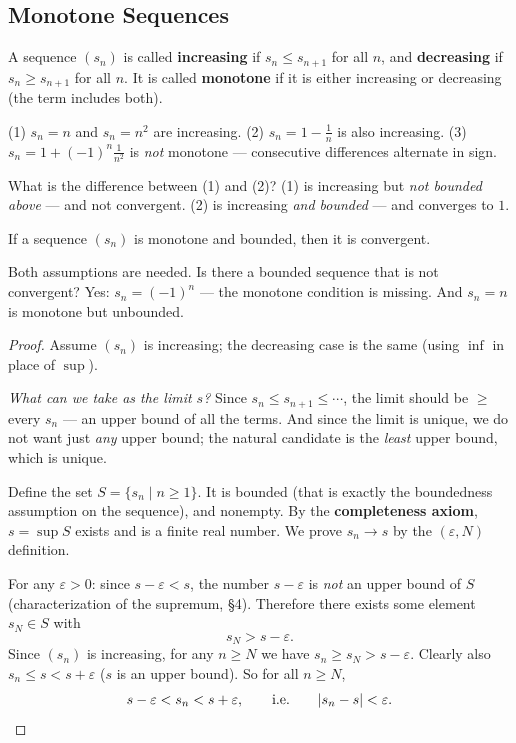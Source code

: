\documentclass[11pt]{report}
\begin{document}
\subsection{Monotone Sequences}

\begin{defbox}
A sequence $(s_n)$ is called \textbf{increasing} if $s_n \leq s_{n+1}$ for all $n$, and \textbf{decreasing} if $s_n \geq s_{n+1}$ for all $n$. It is called \textbf{monotone} if it is either increasing or decreasing (the term includes both).
\end{defbox}

\begin{exbox}
(1) $s_n = n$ and $s_n = n^2$ are increasing. (2) $s_n = 1 - \tfrac1n$ is also increasing. (3) $s_n = 1 + (-1)^n \tfrac{1}{n^2}$ is \emph{not} monotone --- consecutive differences alternate in sign.

What is the difference between (1) and (2)? (1) is increasing but \emph{not bounded above} --- and not convergent. (2) is increasing \emph{and bounded} --- and converges to $1$.
\end{exbox}

\begin{thmbox}
If a sequence $(s_n)$ is monotone and bounded, then it is convergent.
\end{thmbox}

\begin{rembox}
Both assumptions are needed. Is there a bounded sequence that is not convergent? Yes: $s_n = (-1)^n$ --- the monotone condition is missing. And $s_n = n$ is monotone but unbounded.
\end{rembox}

\begin{proof}
Assume $(s_n)$ is increasing; the decreasing case is the same (using $\inf$ in place of $\sup$).

\emph{What can we take as the limit $s$?} Since $s_n \leq s_{n+1} \leq \cdots$, the limit should be $\geq$ every $s_n$ --- an upper bound of all the terms. And since the limit is unique, we do not want just \emph{any} upper bound; the natural candidate is the \emph{least} upper bound, which is unique.

Define the set $S = \{s_n \mid n \geq 1\}$. It is bounded (that is exactly the boundedness assumption on the sequence), and nonempty. By the \textbf{completeness axiom}, $s = \sup S$ exists and is a finite real number. We prove $s_n \to s$ by the $(\varepsilon, N)$ definition.

For any $\varepsilon > 0$: since $s - \varepsilon < s$, the number $s - \varepsilon$ is \emph{not} an upper bound of $S$ (characterization of the supremum, \S 4). Therefore there exists some element $s_N \in S$ with
\[
s_N > s - \varepsilon.
\]
Since $(s_n)$ is increasing, for any $n \geq N$ we have $s_n \geq s_N > s - \varepsilon$. Clearly also $s_n \leq s < s + \varepsilon$ ($s$ is an upper bound). So for all $n \geq N$,
\[
s - \varepsilon < s_n < s + \varepsilon, \qquad \text{i.e.} \qquad |s_n - s| < \varepsilon. \qedhere
\]
\end{proof}
\end{document}

